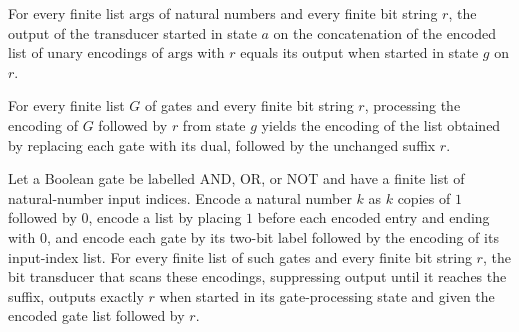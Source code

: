 \begin{theorem}
\label{BoolCircuit.CktSatReduction.S_args}
\leanok
{}
For every finite list $\mathrm{args}$ of natural numbers and every finite bit string
$r$, the output of the transducer started in state $a$ on the concatenation of the
encoded list of unary encodings of $\mathrm{args}$ with $r$ equals its output when
started in state $g$ on $r$.
\end{theorem}

\begin{theorem}
\label{BoolCircuit.CktSatReduction.T_gates}
\leanok
{}
For every finite list $G$ of gates and every finite bit string $r$, processing the
encoding of $G$ followed by $r$ from state $g$ yields the encoding of the list obtained
by replacing each gate with its dual, followed by the unchanged suffix $r$.
\end{theorem}

\begin{theorem}
\label{BoolCircuit.CktSatReduction.S_gates}
\leanok
{}
Let a Boolean gate be labelled AND, OR, or NOT and have a finite list of natural-number
input indices. Encode a natural number $k$ as $k$ copies of $1$ followed by $0$, encode
a list by placing $1$ before each encoded entry and ending with $0$, and encode each
gate by its two-bit label followed by the encoding of its input-index list. For every
finite list of such gates and every finite bit string $r$, the bit transducer that scans
these encodings, suppressing output until it reaches the suffix, outputs exactly $r$
when started in its gate-processing state and given the encoded gate list followed by
$r$.
\end{theorem}

